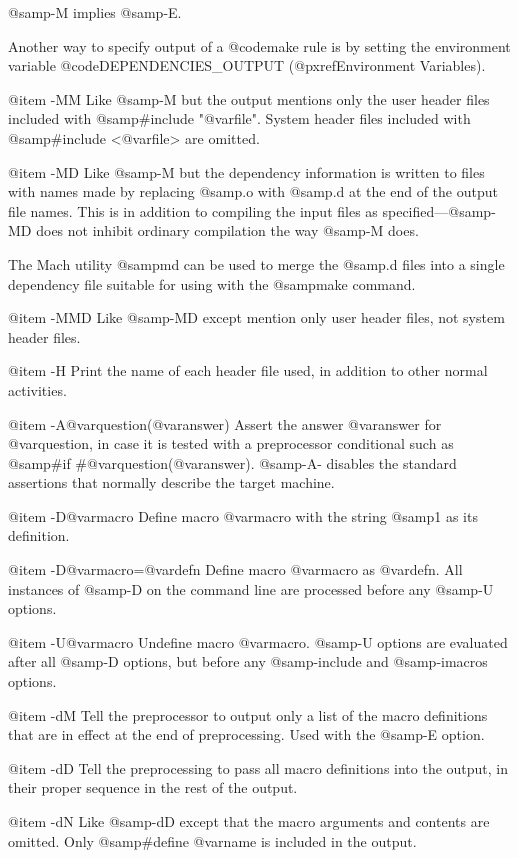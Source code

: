 {{@samp{-M} implies @samp{-E}.

Another way to specify output of a @code{make} rule is by setting
the environment variable @code{DEPENDENCIES_OUTPUT} (@pxref{Environment
Variables}).

@item -MM
Like @samp{-M} but the output mentions only the user header files
included with @samp{#include "@var{file}"}.  System header files
included with @samp{#include <@var{file}>} are omitted.

@item -MD
Like @samp{-M} but the dependency information is written to files with
names made by replacing @samp{.o} with @samp{.d} at the end of the
output file names.  This is in addition to compiling the input files as
specified---@samp{-MD} does not inhibit ordinary compilation the way
@samp{-M} does.

The Mach utility @samp{md} can be used to merge the @samp{.d} files
into a single dependency file suitable for using with the @samp{make}
command.

@item -MMD
Like @samp{-MD} except mention only user header files, not system
header files.

@item -H
Print the name of each header file used, in addition to other normal
activities.

@item -A@var{question}(@var{answer})
Assert the answer @var{answer} for @var{question}, in case it is tested
with a preprocessor conditional such as @samp{#if
#@var{question}(@var{answer})}.  @samp{-A-} disables the standard
assertions that normally describe the target machine.

@item -D@var{macro}
Define macro @var{macro} with the string @samp{1} as its definition.

@item -D@var{macro}=@var{defn}
Define macro @var{macro} as @var{defn}.  All instances of @samp{-D} on
the command line are processed before any @samp{-U} options.

@item -U@var{macro}
Undefine macro @var{macro}.  @samp{-U} options are evaluated after all
@samp{-D} options, but before any @samp{-include} and @samp{-imacros}
options.

@item -dM
Tell the preprocessor to output only a list of the macro definitions
that are in effect at the end of preprocessing.  Used with the @samp{-E}
option.

@item -dD
Tell the preprocessing to pass all macro definitions into the output, in
their proper sequence in the rest of the output.

@item -dN
Like @samp{-dD} except that the macro arguments and contents are omitted.
Only @samp{#define @var{name}} is included in the output.

}}
